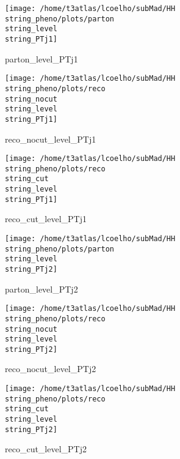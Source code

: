 \documentclass[a4paper,onecolumn,final,11pt]{article}
\begin{document}
\begin{figure}[H] 
\centering 
\begin{minipage}{.32\textwidth} 
        \centering 
        \hspace{0cm} 
        \texttt{[image: /home/t3atlas/lcoelho/subMad/HH\\string\_pheno/plots/parton\\string\_level\\string\_PTj1]} 
        \caption{parton_level_PTj1} 
\end{minipage} 
\hfill 
\begin{minipage}{.32\textwidth} 
        \centering 
        \hspace{0cm} 
    \texttt{[image: /home/t3atlas/lcoelho/subMad/HH\\string\_pheno/plots/reco\\string\_nocut\\string\_level\\string\_PTj1]} 
        \caption{reco_nocut_level_PTj1} 
\end{minipage} 
\hfill 
\begin{minipage}{.32\textwidth} 
        \centering 
        \hspace{0cm} 
    \texttt{[image: /home/t3atlas/lcoelho/subMad/HH\\string\_pheno/plots/reco\\string\_cut\\string\_level\\string\_PTj1]} 
        \caption{reco_cut_level_PTj1} 
\end{minipage} 
\end{figure} 
 
\begin{figure}[H] 
\centering 
\begin{minipage}{.32\textwidth} 
        \centering 
        \hspace{0cm} 
        \texttt{[image: /home/t3atlas/lcoelho/subMad/HH\\string\_pheno/plots/parton\\string\_level\\string\_PTj2]} 
        \caption{parton_level_PTj2} 
\end{minipage} 
\hfill 
\begin{minipage}{.32\textwidth} 
        \centering 
        \hspace{0cm} 
    \texttt{[image: /home/t3atlas/lcoelho/subMad/HH\\string\_pheno/plots/reco\\string\_nocut\\string\_level\\string\_PTj2]} 
        \caption{reco_nocut_level_PTj2} 
\end{minipage} 
\hfill 
\begin{minipage}{.32\textwidth} 
        \centering 
        \hspace{0cm} 
    \texttt{[image: /home/t3atlas/lcoelho/subMad/HH\\string\_pheno/plots/reco\\string\_cut\\string\_level\\string\_PTj2]} 
        \caption{reco_cut_level_PTj2} 
\end{minipage} 
\end{figure} 
 
\end{document}

